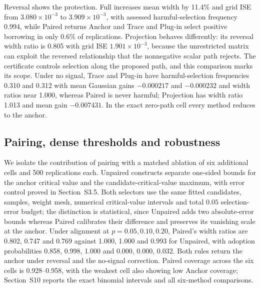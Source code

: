 Reversal shows the protection. Full increases mean width by 11.4\% and grid ISE from $3.080\times10^{-3}$ to $3.909\times10^{-3}$, with assessed harmful-selection frequency 0.994, while Paired returns Anchor and Trace and Plug-in select positive borrowing in only 0.6\% of replications. Projection behaves differently: its reversal width ratio is 0.805 with grid ISE $1.901\times10^{-3}$, because the unrestricted matrix can exploit the reversed relationship that the nonnegative scalar path rejects. The certificate controls selection along the proposed path, and this comparison marks its scope. Under no signal, Trace and Plug-in have harmful-selection frequencies 0.310 and 0.312 with mean Gaussian gains $-0.000217$ and $-0.000232$ and width ratios near 1.000, whereas Paired is never harmful; Projection has width ratio 1.013 and mean gain $-0.007431$. In the exact zero-path cell every method reduces to the anchor.



\subsection{Pairing, dense thresholds and robustness}
We isolate the contribution of pairing with a matched ablation of six additional cells and 500 replications each. Unpaired constructs separate one-sided bounds for the anchor critical value and the candidate-critical-value maximum, with error control proved in Section~S3.5. Both selectors use the same fitted candidates, samples, weight mesh, numerical critical-value intervals and total $0.05$ selection-error budget; the distinction is statistical, since Unpaired adds two absolute-error bounds whereas Paired calibrates their difference and preserves its vanishing scale at the anchor. Under alignment at $p=0.05,0.10,0.20$, Paired's width ratios are 0.802, 0.747 and 0.769 against 1.000, 1.000 and 0.993 for Unpaired, with adoption probabilities 0.858, 0.998, 1.000 and 0.000, 0.000, 0.032. Both rules return the anchor under reversal and the no-signal correction. Paired coverage across the six cells is 0.928--0.958, with the weakest cell also showing low Anchor coverage; Section~S10 reports the exact binomial intervals and all six-method comparisons.

